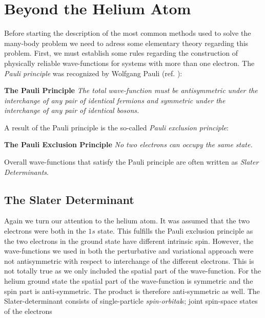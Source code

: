 \section{Beyond the Helium Atom}

Before starting the description of the most common methods used to
solve the many-body problem we need to adress some elementary theory
regarding this problem. First, we must
establish some rules regarding the construction of physically reliable
wave-functions for systems with more than one electron. 
\newline
%
\newline
The \emph{Pauli principle} was recognized by Wolfgang Pauli
(ref. \cite{atkins2003}):
\newline

{\bf \large The Pauli Principle}
\emph{
The total wave-function
must be antisymmetric under the interchange 
of any pair of identical fermions and symmetric under the
interchange of any pair of identical bosons.
\newline
}

A result of the Pauli principle is the so-called \emph{Pauli exclusion
  principle}:
\newline

{\bf \large The Pauli Exclusion Principle}
\emph{
  No two electrons can occupy the same state.
\newline
}

Overall wave-functions that satisfy the Pauli principle are often
written as \emph{Slater Determinants}.

\subsection{The Slater Determinant}

Again we turn our attention to the helium atom. It was assumed that
the two electrons were both in the $1s$ state. This fulfills the Pauli
exclusion principle as the two electrons in the ground state have
different intrinsic spin. However, the wave-functions we used in both
the perturbative and variational approach were not antisymmetric with
respect to interchange of the different electrons. This is not totally 
true as we only included the spatial part of the wave-function.
For the helium ground state the spatial part of the wave-function is
symmetric and the spin part is anti-symmetric. The product is
therefore anti-symmetric as well. The Slater-determinant consists of
single-particle \emph{spin-orbital}s; joint spin-space states of the
electrons

